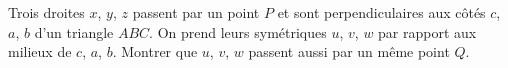 Trois droites $x$, $y$, $z$ passent par un point $P$ et sont perpendiculaires aux côtés $c$, $a$, $b$ d'un triangle $ABC$. On prend leurs symétriques $u$, $v$, $w$ par rapport aux milieux de $c$, $a$, $b$. Montrer que $u$, $v$, $w$ passent aussi par un même point $Q$.

